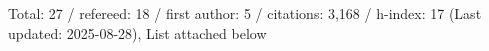 Total: 27 / refereed: 18 / first author: 5 / citations: 3,168 / h-index: 17 (Last updated: 2025-08-28), List attached below